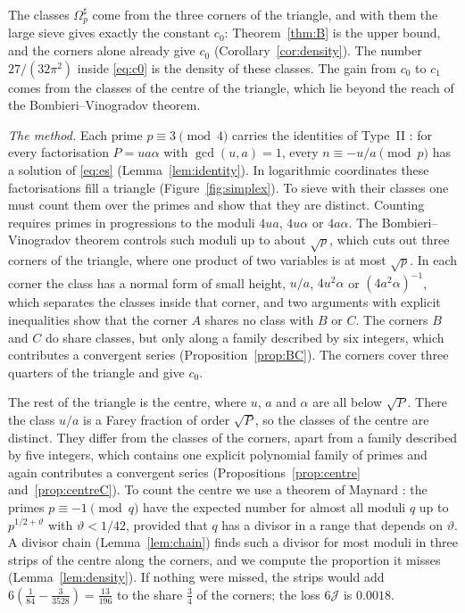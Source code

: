 \documentclass[aps,prd,twocolumn,superscriptaddress,nofootinbib,longbibliography,floatfix,showkeys,nobalancelastpage,amsmath,amssymb,10pt]{revtex4-2}
\theoremstyle{plain}
\theoremstyle{definition}
\theoremstyle{plain}
\newcommand{\Jc}{\mathcal{J}}
\begin{document}
The classes $\Omega^\sharp_p$ come from the three corners of the triangle, and with them the large sieve gives exactly the constant $c_0$: Theorem~\ref{thm:B} is the upper bound, and the corners alone already give $c_0$ (Corollary~\ref{cor:density}). The number $27/(32\pi^2)$ inside \eqref{eq:c0} is the density of these classes. The gain from $c_0$ to $c_1$ comes from the classes of the centre of the triangle, which lie beyond the reach of the Bombieri--Vinogradov theorem.

\textit{The method.} Each prime $p\equiv3\pmod4$ carries the identities of Type~II \cite{ET}: for every factorisation $P=ua\alpha$ with $\gcd(u,a)=1$, every $n\equiv-u/a\pmod p$ has a solution of \eqref{eq:es} (Lemma~\ref{lem:identity}). In logarithmic coordinates these factorisations fill a triangle (Figure~\ref{fig:simplex}). To sieve with their classes one must count them over the primes and show that they are distinct. Counting requires primes in progressions to the moduli $4ua$, $4u\alpha$ or $4a\alpha$. The Bombieri--Vinogradov theorem controls such moduli up to about $\sqrt p$, which cuts out three corners of the triangle, where one product of two variables is at most $\sqrt p$. In each corner the class has a normal form of small height, $u/a$, $4u^2\alpha$ or $(4a^2\alpha)^{-1}$, which separates the classes inside that corner, and two arguments with explicit inequalities show that the corner $A$ shares no class with $B$ or $C$. The corners $B$ and $C$ do share classes, but only along a family described by six integers, which contributes a convergent series (Proposition~\ref{prop:BC}). The corners cover three quarters of the triangle and give $c_0$.

The rest of the triangle is the centre, where $u$, $a$ and $\alpha$ are all below $\sqrt P$. There the class $u/a$ is a Farey fraction of order $\sqrt P$, so the classes of the centre are distinct. They differ from the classes of the corners, apart from a family described by five integers, which contains one explicit polynomial family of primes and again contributes a convergent series (Propositions~\ref{prop:centre} and~\ref{prop:centreC}). To count the centre we use a theorem of Maynard \cite{May}: the primes $p\equiv-1\pmod q$ have the expected number for almost all moduli $q$ up to $p^{1/2+\vartheta}$ with $\vartheta<1/42$, provided that $q$ has a divisor in a range that depends on $\vartheta$. A divisor chain (Lemma~\ref{lem:chain}) finds such a divisor for most moduli in three strips of the centre along the corners, and we compute the proportion it misses (Lemma~\ref{lem:density}). If nothing were missed, the strips would add $6(\frac1{84}-\frac3{3528})=\frac{13}{196}$ to the share $\frac34$ of the corners; the loss $6\Jc$ is $0.0018$.
\end{document}

